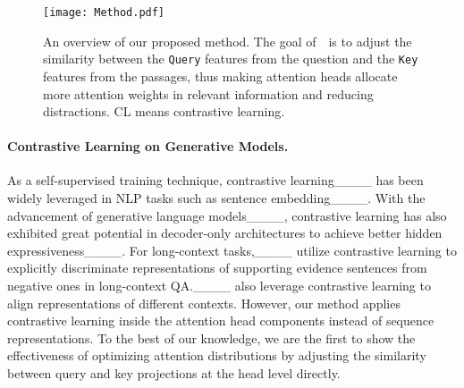 \begin{figure*}[th]
    \centering
    \texttt{[image: Method.pdf]}
    \caption{An overview of our proposed method. The goal of~\method~is to adjust the similarity between the \texttt{Query} features from the question and the \texttt{Key} features from the passages, thus making attention heads allocate more attention weights in relevant information and reducing distractions. CL means contrastive learning.}
    \label{fig:overview}
\end{figure*}


\paragraph{Contrastive Learning on Generative Models.} As a self-supervised training technique, contrastive learning____ has been widely leveraged in NLP tasks such as sentence embedding____. With the advancement of generative language models____, contrastive learning has also exhibited great potential in decoder-only architectures to achieve better hidden expressiveness____. For long-context tasks,____ utilize contrastive learning to explicitly discriminate representations of supporting evidence sentences from negative ones in long-context QA.____ also leverage contrastive learning to align representations of different contexts. However, our method applies contrastive learning inside the attention head components instead of sequence representations. To the best of our knowledge, we are the first to show the effectiveness of optimizing attention distributions by adjusting the similarity between query and key projections at the head level directly.
